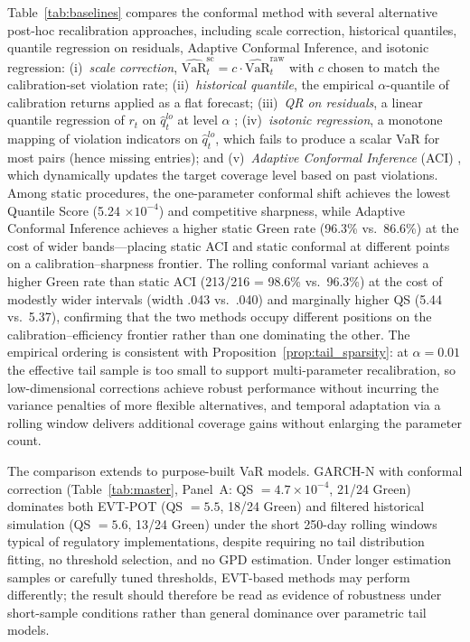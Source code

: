 \documentclass[preprint,11pt,authoryear]{elsarticle}
\newcommand{\VaR}{\mathrm{VaR}}
\newcommand{\1}{\boldsymbol{1}}
\begin{document}
	Table~\ref{tab:baselines} compares the conformal method with
	several alternative post-hoc recalibration approaches, including scale correction, historical quantiles, quantile regression on residuals, Adaptive Conformal Inference, and isotonic regression: (i)~\emph{scale correction},
	$\widehat{\VaR}_t^{\mathrm{sc}} = c \cdot
	\widehat{\VaR}_t^{\mathrm{raw}}$ with $c$ chosen to match the
	calibration-set violation rate; (ii)~\emph{historical quantile},
	the empirical $\alpha$-quantile of calibration returns applied
	as a flat forecast; (iii)~\emph{QR on residuals}, a linear
	quantile regression of $r_t$ on $\hat{q}_t^{lo}$ at level
	$\alpha$ \citep[cf.][]{romano2019conformalized};
	(iv)~\emph{isotonic regression}, a monotone mapping of
	violation indicators on $\hat{q}_t^{lo}$, which fails to
	produce a scalar VaR for most pairs (hence missing entries); and
	(v)~\emph{Adaptive Conformal Inference} (ACI) \citep{gibbs2021adaptive}, which dynamically updates the target coverage level based on past violations.
	Among static procedures, the one-parameter conformal shift achieves the lowest Quantile Score (5.24 $\times 10^{-4}$) and competitive sharpness, while Adaptive Conformal Inference \citep{gibbs2021adaptive} achieves a higher static Green rate (96.3\% vs.\ 86.6\%) at the cost of wider bands---placing static ACI and static conformal at different points on a calibration--sharpness frontier. The rolling conformal variant achieves a higher Green rate than static ACI (213/216 = 98.6\% vs.\ 96.3\%) at the cost of modestly wider intervals (width .043 vs.\ .040) and marginally higher QS (5.44 vs.\ 5.37), confirming that the two methods occupy different positions on the calibration--efficiency frontier rather than one dominating the other. The empirical ordering is consistent with Proposition~\ref{prop:tail_sparsity}: at $\alpha = 0.01$ the effective tail sample is too small to support multi-parameter recalibration, so low-dimensional corrections achieve robust performance without incurring the variance penalties of more flexible alternatives, and temporal adaptation via a rolling window delivers additional coverage gains without enlarging the parameter count.

	The comparison extends to purpose-built VaR models. GARCH-N with conformal correction (Table~\ref{tab:master}, Panel~A: QS $= 4.7 \times 10^{-4}$, 21/24 Green) dominates both EVT-POT (QS $= 5.5$, 18/24 Green) and filtered historical simulation (QS $= 5.6$, 13/24 Green) under the short 250-day rolling windows typical of regulatory implementations, despite requiring no tail distribution fitting, no threshold selection, and no GPD estimation. Under longer estimation samples or carefully tuned thresholds, EVT-based methods may perform differently; the result should therefore be read as evidence of robustness under short-sample conditions rather than general dominance over parametric tail models.
\end{document}
